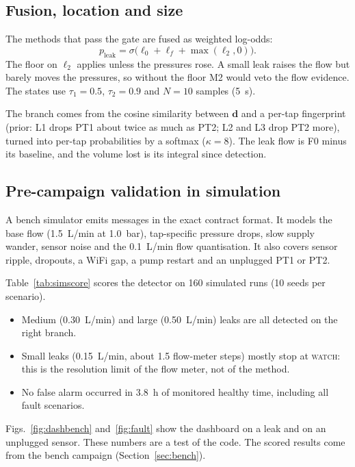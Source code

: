 \documentclass[conference]{IEEEtran}
\begin{document}
\subsection{Fusion, location and size}
The methods that pass the gate are fused as weighted log-odds:
\begin{equation}
p_{\mathrm{leak}} = \sigma\Big(\ell_0 + \ell_f + \max(\ell_2, 0)\Big).
\end{equation}
The floor on $\ell_2$ applies unless the pressures rose. A small leak raises the flow but barely
moves the pressures, so without the floor M2 would veto the flow evidence. The states use
$\tau_1 = 0.5$, $\tau_2 = 0.9$ and $N = 10$ samples (5~s).

The branch comes from the cosine similarity between $\mathbf d$ and a per-tap fingerprint
(prior: L1 drops PT1 about twice as much as PT2; L2 and L3 drop PT2 more), turned into per-tap
probabilities by a softmax ($\kappa = 8$). The leak flow is F0 minus its baseline, and the
volume lost is its integral since detection.

\subsection{Pre-campaign validation in simulation}
A bench simulator emits messages in the exact contract format. It models the base flow
(1.5~L/min at 1.0~bar), tap-specific pressure drops, slow supply wander, sensor noise and the
0.1~L/min flow quantisation. It also covers sensor ripple, dropouts, a WiFi gap, a pump restart
and an unplugged PT1 or PT2.

Table~\ref{tab:simscore} scores the detector on 160 simulated runs (10 seeds per scenario).
\begin{itemize}
\item Medium (0.30~L/min) and large (0.50~L/min) leaks are all detected on the right branch.
\item Small leaks (0.15~L/min, about 1.5 flow-meter steps) mostly stop at \textsc{watch}: this
  is the resolution limit of the flow meter, not of the method.
\item No false alarm occurred in 3.8~h of monitored healthy time, including all fault
  scenarios.
\end{itemize}
Figs.~\ref{fig:dashbench} and~\ref{fig:fault} show the dashboard on a leak and on an unplugged
sensor. These numbers are a test of the code. The scored results come from the bench campaign
(Section~\ref{sec:bench}).
\end{document}
